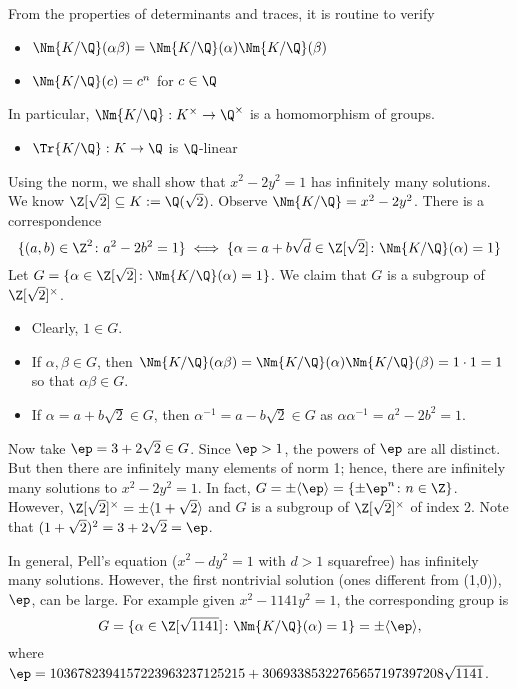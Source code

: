 From the properties of determinants and traces, it is routine to verify

\begin{prop} \hfill
	\begin{itemize}
	\item $\Nm{K/\Q}(\alpha\beta)=\Nm{K/\Q}(\alpha) \Nm{K/\Q}(\beta)$
	\item $\Nm{K/\Q}(c)=c^n$ for $c \in \Q$
	\end{itemize}
In particular, $\Nm{K/\Q}: K^\times \to \Q^\times$ is a homomorphism of groups.
	\begin{itemize}
	\item $\Tr{K/\Q}: K \to \Q$ is $\Q$-linear
	\end{itemize}
\end{prop}

\begin{ex}[Pell's Equation, $n=2$] \label{ex:pell2}
Using the norm, we shall show that $x^2-2y^2=1$ has infinitely many solutions. We know $\Z[\sqrt{2}] \subseteq K:=\Q(\sqrt{2})$. Observe $\Nm{K/\Q}=x^2-2y^2$. There is a correspondence
	\[
	\{(a,b) \in \Z^2 \colon a^2-2b^2=1\} \iff \{\alpha=a+b\sqrt{d} \in \Z[\sqrt{2}] \colon \Nm{K/\Q}(\alpha)=1\}
	\] 
Let $G=\{\alpha \in \Z[\sqrt{2}] \colon \Nm{K/\Q}(\alpha)=1\}$. We claim that $G$ is a subgroup of $\Z[\sqrt{2}]^\times$.
	\begin{itemize}
	\item Clearly, $1 \in G$.
	\item If $\alpha, \beta \in G$, then $\Nm{K/\Q}(\alpha\beta)=\Nm{K/\Q}(\alpha)\Nm{K/\Q}(\beta)=1\cdot 1=1$ so that $\alpha\beta \in G$.
	\item If $\alpha=a+b\sqrt{2} \in G$, then $\alpha^{-1}=a-b\sqrt{2} \in G$ as $\alpha\alpha^{-1}=a^2-2b^2=1$.
	\end{itemize}
Now take $\ep=3+2\sqrt{2} \in G$. Since $\ep>1$, the powers of $\ep$ are all distinct. But then there are infinitely many elements of norm 1; hence, there are infinitely many solutions to $x^2-2y^2=1$. In fact, $G=\pm \langle \ep \rangle=\{ \pm \ep^n \colon n \in \Z\}$. However, $\Z[\sqrt{2}]^\times= \pm \langle 1+\sqrt{2}\rangle$ and $G$ is a subgroup of $\Z[\sqrt{2}]^\times$ of index 2. Note that $(1+\sqrt{2})^2=3+2\sqrt{2}=\ep$. \xqed
\end{ex}

\begin{ex} \label{ex:pellgen}
In general, Pell's equation ($x^2-dy^2=1$ with $d>1$ squarefree) has infinitely many solutions. However, the first nontrivial solution (ones different from (1,0)), $\ep$, can be large. For example given $x^2-1141y^2=1$, the corresponding group is 
	\[
	G=\{ \alpha \in \Z[\sqrt{1141}] \colon \Nm{K/\Q}(\alpha)=1\}= \pm \langle \ep \rangle,
	\]
where $\ep=1036782394157223963237125215+30693385322765657197397208\sqrt{1141}$. \xqed
\end{ex}


